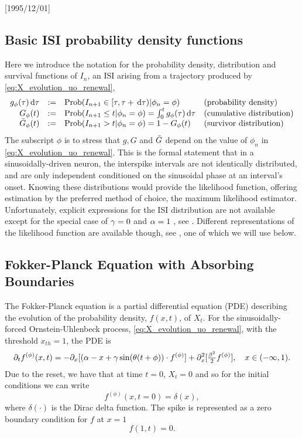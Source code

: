 \NeedsTeXFormat{LaTeX2e}[1995/12/01] \documentclass[10pt]{bmc_article}
\newenvironment{bmcformat}{\begin{raggedright}\baselineskip20pt\sloppy\setboolean{publ}{false}}{\end{raggedright}\baselineskip20pt\sloppy}
\begin{document}
\begin{bmcformat}
\subsection{Basic ISI probability density functions}
Here we introduce the notation for the  probability density, distribution and
survival functions of $I_n$, an ISI arising from a trajectory
produced by \cref{eq:X_evolution_uo_renewal},
\begin{equation} 
\begin{array}{rcll}
g_{\phi}({\tau}) \, \mathrm{d} {\tau} &:=& \operatorname{Prob}(I_{n+1} \in [{\tau}, {\tau} + \, \mathrm{d} {\tau})  | \phi_n =
\phi) &
 \textrm{(probability density)} 
\\ 
G_{\phi}(t) &:=& \operatorname{Prob}(I_{n+1} \leq t  |\phi_n = \phi ) = \int_0^t g_{\phi}({\tau})
\, \mathrm{d} {\tau} &
 \textrm{(cumulative distribution)}
\\
{ \bar{G} }_{\phi}(t) &:= & \operatorname{Prob}(I_{n+1}>t | \phi_n = \phi ) = 1 - G_{\phi}(t)
&
 \textrm{(survivor distribution)}
\end{array}
\label{eq:ISI_distribution_functions}
\end{equation}
The subscript $\phi$ is to stress that $g, G$ and ${ \bar{G} }$ depend on the value of
$\phi_n$ in \cref{eq:X_evolution_uo_renewal}. This is the formal statement that
in a sinusoidally-driven neuron, the interspike intervals are not identically
distributed, and are only independent conditioned on the sinusoidal phase at an
interval's onset. Knowing these distributions would provide the likelihood function,
offering estimation by the preferred method of choice, the maximum likelihood
estimator. Unfortunately, explicit expressions for the ISI distribution are not
available except for the special case of ${\gamma } = 0$ and ${\alpha}=1$ , see
\cite{DitlevsenLansky2005}. Different representations of the likelihood function
are available though, see \cite{Alili2005}, one of which we will use below.

\subsection{Fokker-Planck Equation with Absorbing Boundaries}
\label{sec:fp_estimation}
The Fokker-Planck equation is a partial differential equation (PDE) describing
the evolution of the probability density, $f(x,t)$, of $X_t$. 
For the sinusoidally-forced Ornstein-Uhlenbeck process,
\cref{eq:X_evolution_uo_renewal}, with the threshold $x_{th} = 1$, the PDE is
\begin{equation}
{\partial}_t f^{(\phi)}(x,t) = -{\partial}_x[({\alpha} - x + {\gamma } \sin({\theta} (t + \phi))\cdot
f^{(\phi)}] +{\partial}^2_x[ \tfrac{{\beta}^2}{2}f^{(\phi)}], \quad x \in (-\infty,
1).
\label{eq:FP_pde_OU_absorbBC}
\end{equation}
Due to the reset, we have that at time $t=0$, $X_t=0$  and so for the initial
conditions we can write
\begin{equation}
f^{(\phi)}(x,t=0) = \delta(x) ,
\label{eq:PDF_ICs}
\end{equation}
where $\delta(\cdot)$ is the Dirac delta function. The spike is represented as
a zero boundary condition for $f$ at $x = 1$ $$
f(1, t) =0.
$$


\end{bmcformat}
\end{document}
